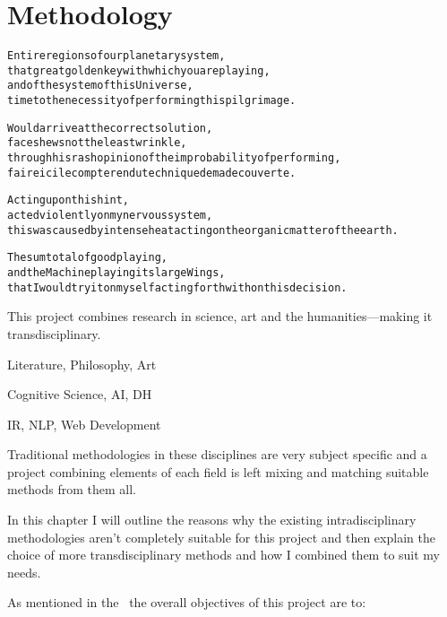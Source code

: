 
\chapter{Methodology}
\label{ch:methodology}

\startcontents[chapters]

\vfill

\begin{alltt}\sffamily
Entire regions of our planetary system,
that great golden key with which you are playing,
and of the system of this Universe,
time to the necessity of performing this pilgrimage.
 
Would arrive at the correct solution,
face shews not the least wrinkle,
through his rash opinion of the improbability of performing,
faire ici le compte rendu technique de ma decouverte.

Acting upon this hint,
acted violently on my nervous system,
this was caused by intense heat acting on the organic matter of the earth.

The sum total of good playing,
and the Machine playing its large Wings,
that I would try it on myself acting forthwith on this decision.
\end{alltt}

\newpage
\minicontents
\spirals


This project combines research in science, art and the humanities---making it transdisciplinary.

\begin{description}[leftmargin=3cm]
  \item [Pataphysics] Literature, Philosophy, Art
  \item [Creativity] Cognitive Science, \ac{AI}, \ac{DH}
  \item [Technology] \ac{IR}, \ac{NLP}, Web Development
\end{description}

Traditional methodologies in these disciplines are very subject specific and a project combining elements of each field is left mixing and matching suitable methods from them all.

In this chapter I will outline the reasons why the existing intradisciplinary methodologies aren't completely suitable for this project and then explain the choice of more transdisciplinary methods and how I combined them to suit my needs.

As mentioned in the~ the overall objectives of this project are to:

